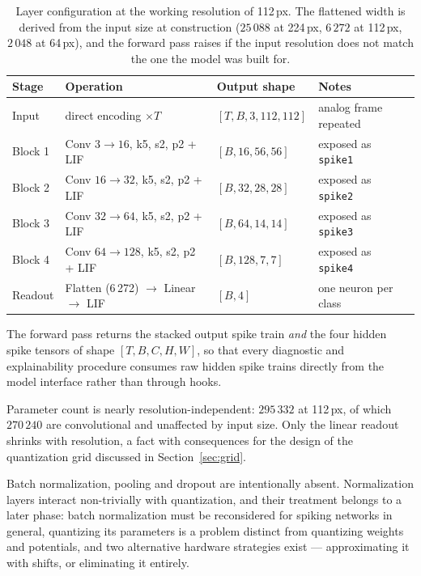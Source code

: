 \begin{table}[htbp]
\centering
\begin{tabular}{llll}
\toprule
Stage & Operation & Output shape & Notes \\
\midrule
Input & direct encoding $\times T$ & $[T, B, 3, 112, 112]$ & analog frame repeated \\
Block 1 & Conv $3\to16$, k5, s2, p2 + LIF & $[B, 16, 56, 56]$ & exposed as \texttt{spike1} \\
Block 2 & Conv $16\to32$, k5, s2, p2 + LIF & $[B, 32, 28, 28]$ & exposed as \texttt{spike2} \\
Block 3 & Conv $32\to64$, k5, s2, p2 + LIF & $[B, 64, 14, 14]$ & exposed as \texttt{spike3} \\
Block 4 & Conv $64\to128$, k5, s2, p2 + LIF & $[B, 128, 7, 7]$ & exposed as \texttt{spike4} \\
Readout & Flatten (6\,272) $\to$ Linear $\to$ LIF & $[B, 4]$ & one neuron per class \\
\bottomrule
\end{tabular}
\caption{Layer configuration at the working resolution of 112\,px. The flattened
width is derived from the input size at construction ($25\,088$ at 224\,px,
$6\,272$ at 112\,px, $2\,048$ at 64\,px), and the forward pass raises if the
input resolution does not match the one the model was built for.}
\label{tab:architecture}
\end{table}

The forward pass returns the stacked output spike train \emph{and} the four
hidden spike tensors of shape $[T, B, C, H, W]$, so that every diagnostic and
explainability procedure consumes raw hidden spike trains directly from the model
interface rather than through hooks.

Parameter count is nearly resolution-independent: $295\,332$ at 112\,px, of which
$270\,240$ are convolutional and unaffected by input size. Only the linear
readout shrinks with resolution, a fact with consequences for the design of the
quantization grid discussed in Section~\ref{sec:grid}.

Batch normalization, pooling and dropout are intentionally absent. Normalization
layers interact non-trivially with quantization, and their treatment belongs to a
later phase: batch normalization must be reconsidered for spiking networks in
general, quantizing its parameters is a problem distinct from quantizing weights
and potentials, and two alternative hardware strategies exist --- approximating
it with shifts, or eliminating it entirely.


